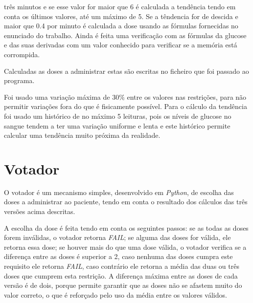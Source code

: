 três minutos e se esse valor for maior que 6 é calculada a tendência tendo em conta os últimos valores, até um máximo
de 5. Se a têndencia for de descida e maior que 0.4 por minuto é calculada a dose usando as fórmulas fornecidas no
enunciado do trabalho. Ainda é feita uma verificação com as fórmulas da glucose e das suas derivadas com um valor
conhecido para verificar se a memória está corrompida.\par
Calculadas as doses a administrar estas são escritas no ficheiro que foi passado ao programa.\par
Foi usado uma variação máxima de 30\% entre os valores nas restrições, para não permitir variações fora do que é
fisicamente possível. Para o cálculo da tendência foi usado um histórico de no máximo 5 leituras, pois os níveis de
glucose no sangue tendem a ter uma variação uniforme e lenta e este histórico permite calcular uma tendência muito
próxima da realidade.

\section{Votador}
\label{sec:votador}
O votador é um mecanismo simples, desenvolvido em \textit{Python}, de escolha das doses a administrar ao paciente, tendo
em conta o resultado dos cálculos das três versões acima descritas.\par
A escolha da dose é feita tendo em conta os seguintes passos: se as todas as doses forem inválidas, o votador retorna
\textit{FAIL}; se alguma das doses for válida, ele retorna essa dose; se houver mais do que uma dose válida, o votador
verifica se a diferença entre as doses é superior a 2, caso nenhuma das doses cumpra este requisito ele retorna
\textit{FAIL}, caso contrário ele retorna a média das duas ou três doses que cumprem esta restrição. A diferença
máxima entre as doses de cada versão é de dois, porque permite garantir que as doses não se afastem muito do valor
correto, o que é reforçado pelo uso da média entre os valores válidos.
